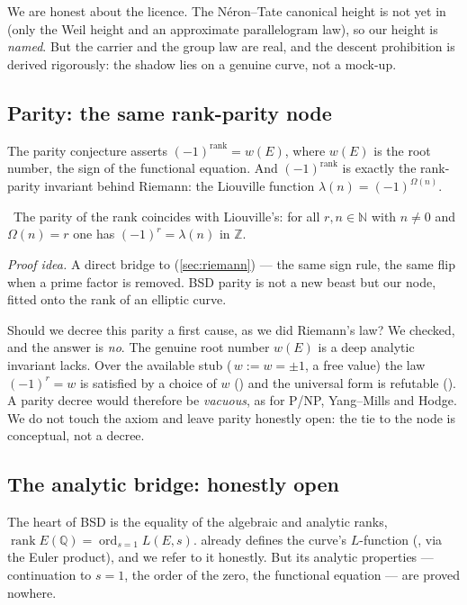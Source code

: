 We are honest about the licence. The Néron–Tate canonical height is not yet in  (only
the Weil height and an approximate parallelogram law), so our height is \emph{named}. But the
carrier and the group law are real, and the descent prohibition is derived rigorously: the shadow
lies on a genuine curve, not a mock-up.

\subsection{Parity: the same rank-parity node}

The parity conjecture asserts $(-1)^{\operatorname{rank}}=w(E)$, where $w(E)$ is the root number,
the sign of the functional equation. And $(-1)^{\operatorname{rank}}$ is exactly the rank-parity
invariant behind Riemann: the Liouville function $\lambda(n)=(-1)^{\Omega(n)}$.

\begin{theorem}\label{thm:bsd_parity_is_rankParity}
\green{}\ The parity of the rank coincides with Liouville's: for all $r,n\in\mathbb{N}$ with
$n\neq 0$ and $\Omega(n)=r$ one has $(-1)^r=\lambda(n)$ in $\mathbb{Z}$.
\end{theorem}

\emph{Proof idea.} A direct bridge to 
(\cref{sec:riemann}) --- the same sign rule, the same flip when a prime factor is removed. BSD
parity is not a new beast but our node, fitted onto the rank of an elliptic curve.

Should we decree this parity a first cause, as we did Riemann's law? We checked, and the answer is
\emph{no}. The genuine root number $w(E)$ is a deep analytic invariant  lacks. Over
the available stub (\,$w:=w=\pm1$, a free value) the law $(-1)^r=w$ is satisfied by
a choice of $w$ () and the universal form is refutable
(). A parity decree would therefore be \emph{vacuous}, as for
P/NP, Yang–Mills and Hodge. We do not touch the axiom and leave parity honestly open: the tie to
the node is conceptual, not a decree.

\subsection{The analytic bridge: honestly open}

The heart of BSD is the equality of the algebraic and analytic ranks,
$\operatorname{rank}E(\mathbb{Q})=\operatorname{ord}_{s=1}L(E,s)$.  already defines the
curve's $L$-function (, via the Euler product), and we refer to it
honestly. But its analytic properties --- continuation to $s=1$, the order of the zero, the
functional equation --- are proved nowhere.

